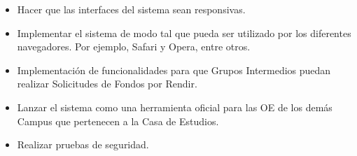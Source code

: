 \begin{itemize}
    \item Hacer que las interfaces del sistema sean responsivas.
    \item Implementar el sistema de modo tal que pueda ser utilizado por los diferentes navegadores. Por ejemplo, Safari y Opera, entre otros.
    \item Implementación de funcionalidades para que Grupos Intermedios puedan realizar Solicitudes de Fondos por Rendir.
    \item Lanzar el sistema como una herramienta oficial para las OE de los demás Campus que pertenecen a la Casa de Estudios.
    \item Realizar pruebas de seguridad.
\end{itemize}
